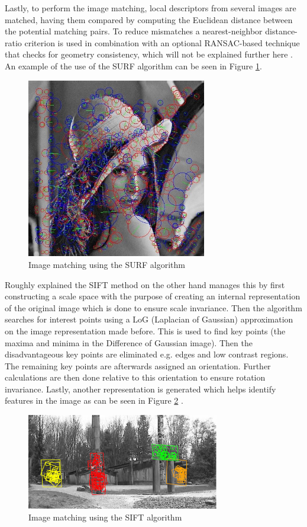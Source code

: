 Lastly, to perform the image matching, local descriptors from several images are matched, having them compared by computing the Euclidean distance between the potential matching pairs. To reduce mismatches a nearest-neighbor distance-ratio criterion is used in combination with an optional RANSAC-based technique that checks for geometry consistency, which will not be explained further here \cite{Oyallon2015}. An example of the use of the SURF algorithm can be seen in Figure \ref{fig:SURF}. 

\begin{figure}[h!]
    \centering
    \includegraphics[width=0.7\textwidth]{figures/SURF.jpg}
    \caption{Image matching using the SURF algorithm}\label{fig:SURF}
\end{figure}

Roughly explained the SIFT method on the other hand manages this by first constructing a scale space with the purpose of creating an internal representation of the original image which is done to ensure scale invariance. Then the algorithm searches for interest points using a LoG (Laplacian of Gaussian) approximation on the image representation made before. This is used to find key points (the maxima and minima in the Difference of Gaussian image). Then the disadvantageous key points are eliminated e.g. edges and low contrast regions. The remaining key points are afterwards assigned an orientation. Further calculations are then done relative to this orientation to ensure rotation invariance. Lastly, another representation is generated which helps identify features in the image as can be seen in Figure \ref{fig:SIFT} \cite{Sinha}.

\begin{figure}[h!]
    \centering
    \includegraphics[width=0.75\textwidth]{figures/SIFT.jpg}
    \caption{Image matching using the SIFT algorithm}\label{fig:SIFT}
\end{figure}

